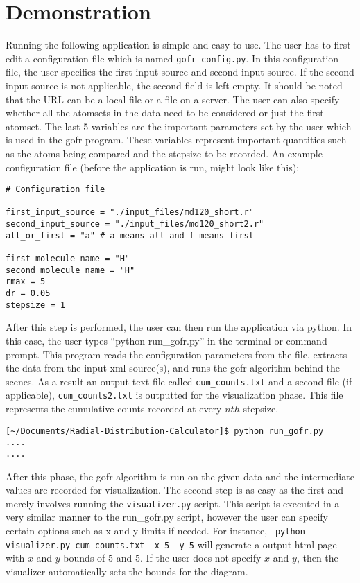 \section*{Demonstration}

Running the following application is simple and easy to use. The user has to first edit a configuration file which is named \verb|gofr_config.py|. In this configuration file, the user specifies the first input source and second input source. If the second input source is not applicable, the second field is left empty. It should be noted that the URL can be a local file or a file on a server. The user can also specify whether all the atomsets in the data need to be considered or just the first atomset. The last 5 variables are the important parameters set by the user which is used in the gofr program. These variables represent important quantities such as the atoms being compared and the stepsize to be recorded. An example configuration file (before the application is run, might look like this):

\begin{verbatim}
# Configuration file

first_input_source = "./input_files/md120_short.r"
second_input_source = "./input_files/md120_short2.r"
all_or_first = "a" # a means all and f means first

first_molecule_name = "H"
second_molecule_name = "H"
rmax = 5
dr = 0.05
stepsize = 1
\end{verbatim}


After this step is performed, the user can then run the application via python. In this case, the user types ``python run\_gofr.py'' in the terminal or command prompt. This program reads the configuration parameters from the file, extracts the data from the input xml source(s), and runs the gofr algorithm behind the scenes. As a result an output text file called \verb|cum_counts.txt| and a second file (if applicable), \verb|cum_counts2.txt| is outputted for the visualization phase. This file represents the cumulative counts recorded at every $nth$ stepsize. 


\begin{verbatim}
[~/Documents/Radial-Distribution-Calculator]$ python run_gofr.py
....
....
\end{verbatim}

After this phase, the gofr algorithm is run on the given data and the intermediate values are recorded for visualization. The second step is as easy as the first and merely involves running the \verb|visualizer.py| script. This script is executed in a very similar manner to the run\_gofr.py script, however the user can specify certain options such as x and y limits if needed. For instance, \verb| python visualizer.py cum_counts.txt -x 5 -y 5| will generate a output html page with $x$ and $y$ bounds of $5$ and $5$. If the user does not specify $x$ and $y$, then the visualizer automatically sets the bounds for the diagram.

